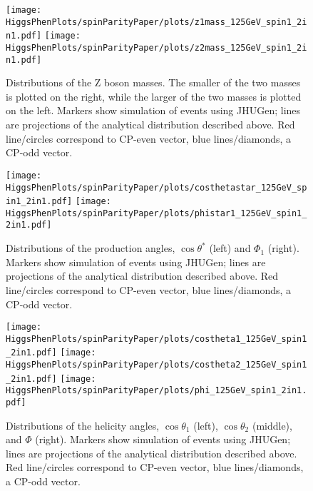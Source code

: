 \begin{figure}
\begin{center}
\texttt{[image: HiggsPhenPlots/spinParityPaper/plots/z1mass\_125GeV\_spin1\_2in1.pdf]}
\texttt{[image: HiggsPhenPlots/spinParityPaper/plots/z2mass\_125GeV\_spin1\_2in1.pdf]}
\label{fig:VectorMasses}
\caption{Distributions of the Z boson masses.  The smaller of the two masses is
plotted on the right, while the larger of the two masses is plotted on the
left. Markers show simulation of events using JHUGen; lines are projections
of the analytical distribution described above.  Red line/circles correspond
to CP-even vector, blue lines/diamonds, a CP-odd vector.}
\end{center}
\end{figure}

\begin{figure}
\begin{center}
\texttt{[image: HiggsPhenPlots/spinParityPaper/plots/costhetastar\_125GeV\_spin1\_2in1.pdf]}
\texttt{[image: HiggsPhenPlots/spinParityPaper/plots/phistar1\_125GeV\_spin1\_2in1.pdf]}
\label{fig:VectorProdAngles}
\caption{Distributions of the production angles, $\cos\theta^*$ (left) and 
$\Phi_1$ (right).  Markers show simulation of events using JHUGen; lines 
are projections
of the analytical distribution described above.   Red line/circles correspond
to CP-even vector, blue lines/diamonds, a CP-odd vector.}
\end{center}
\end{figure}

\begin{figure}
\begin{center}
\texttt{[image: HiggsPhenPlots/spinParityPaper/plots/costheta1\_125GeV\_spin1\_2in1.pdf]}
\texttt{[image: HiggsPhenPlots/spinParityPaper/plots/costheta2\_125GeV\_spin1\_2in1.pdf]}
\texttt{[image: HiggsPhenPlots/spinParityPaper/plots/phi\_125GeV\_spin1\_2in1.pdf]}
\label{fig:VectorHelicityAngles}
\caption{Distributions of the helicity angles, $\cos\theta_1$ (left), 
$\cos\theta_2$ (middle), and $\Phi$ (right). Markers show simulation of 
events using JHUGen; lines are projections
of the analytical distribution described above.  Red line/circles correspond
to CP-even vector, blue lines/diamonds, a CP-odd vector.}
\end{center}
\end{figure}

